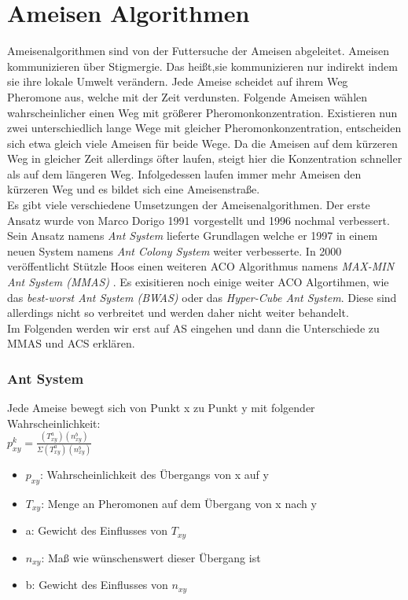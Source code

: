 \section{Ameisen Algorithmen}
Ameisenalgorithmen sind von der Futtersuche der Ameisen abgeleitet. Ameisen kommunizieren über Stigmergie. Das heißt,sie kommunizieren nur indirekt indem sie ihre lokale Umwelt verändern. Jede Ameise scheidet auf ihrem Weg Pheromone aus, welche mit der Zeit verdunsten. 
Folgende Ameisen wählen wahrscheinlicher einen Weg mit größerer Pheromonkonzentration. 
Existieren nun zwei unterschiedlich lange Wege mit gleicher Pheromonkonzentration, entscheiden sich etwa gleich viele Ameisen für beide Wege\cite{dorigo2000ant}.
Da die Ameisen auf dem kürzeren Weg in gleicher Zeit allerdings öfter laufen, steigt hier die Konzentration schneller als auf dem längeren Weg. 
Infolgedessen laufen immer mehr Ameisen den kürzeren Weg und es bildet sich eine Ameisenstraße.\\
Es gibt viele verschiedene Umsetzungen der Ameisenalgorithmen. Der erste Ansatz wurde von Marco Dorigo 1991 vorgestellt\cite{Dorigo1991AntSA} und 1996 nochmal verbessert\cite{484436}.
Sein Ansatz namens \emph{Ant System} lieferte Grundlagen welche er 1997 in einem neuen System namens \emph{Ant Colony System} weiter verbesserte\cite{585892}. In 2000 veröffentlicht Stützle Hoos einen weiteren ACO Algorithmus namens \emph{MAX-MIN Ant System (MMAS)} \cite{STUTZLE2000889}. Es exisitieren noch einige weiter ACO Algortihmen, wie das \emph{best-worst Ant System (BWAS)}\cite{cordon2000new} oder das \emph{Hyper-Cube Ant System}\cite{blum2004hyper}. Diese sind allerdings nicht so verbreitet und werden daher nicht weiter behandelt. \\
Im Folgenden werden wir erst auf AS eingehen und dann die Unterschiede zu MMAS und ACS erklären.
\subsubsection{Ant System}
Jede Ameise bewegt sich von Punkt x zu Punkt y mit folgender Wahrscheinlichkeit: \\

\large$p_{xy}^k=\frac{(T_{xy}^a)(n_{xy}^b)}{\Sigma(T_{xy}^a)(n_{xy}^b) }$
\normalsize
\begin{itemize}
  \item $p_{xy}$: Wahrscheinlichkeit des Übergangs von x auf y
  \item $T_{xy}$: Menge an Pheromonen auf dem Übergang von x nach y 
  \item a: Gewicht des Einflusses von $T_{xy}$
  \item $n_{xy}$: Maß wie wünschenswert dieser Übergang ist
  \item b: Gewicht des Einflusses von $n_{xy}$
\end{itemize}


